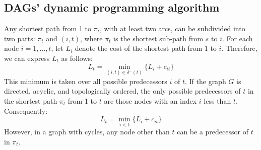\subsection{DAGs' dynamic programming algorithm}
Any shortest path from 1 to $\pi_t$, with at least two arcs, can be subdivided into two parts: $\pi_t$ and $(i,t)$, where $\pi_t$ is the shortest sub-path from $s$ to $i$. 
For each node  $i=1,\dots,t$, let $L_i$ denote the cost of the shortest path from $1$ to $i$. 
Therefore, we can express $L_t$ as follows:
\[L_t=\min_{(i,t) \in \delta^{-}(t)}\{L_i+c_{it}\}\]
This minimum is taken over all possible predecessors $i$ of $t$.
If the graph $G$ is directed, acyclic, and topologically ordered, the only possible predecessors of $t$ in the shortest path $\pi_t$ from 1 to $t$ are those nodes with an index $i$ less than $t$. 
Consequently:
\[L_t=\min_{i<t}\{L_i+c_{it}\}\]
However, in a graph with cycles, any node other than $t$ can be a predecessor of $t$ in $\pi_t$.  


